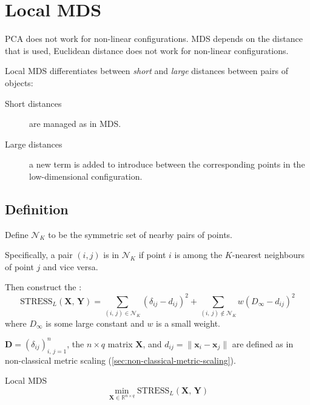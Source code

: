 \pagebreak
\section{Local MDS}

PCA does not work for non-linear configurations. MDS depends on the distance that is
used, Euclidean distance does not work for non-linear configurations.

\begin{note}
	Local MDS differentiates between \emph{short} and \emph{large} distances between
	pairs of objects:
	\begin{description}
		\item[Short distances] are managed as in MDS.
		\item[Large distances] a new term is added to introduce  between the
			corresponding points in the low-dimensional configuration.
	\end{description}
\end{note}

\subsection{Definition}

Define $\mathcal N_K$ to be the symmetric set of nearby pairs of points.

Specifically, a pair $(i, j)$ is in $\mathcal N_K$ if point $i$ is among the $K$-nearest
neighbours of point $j$ and vice versa.

Then construct the :
\begin{equation*}
	\text{STRESS}_L(\boldsymbol X,\, \boldsymbol Y) = \sum_{(i,\, j) \in \mathcal N_K} (\delta_{ij} - d_{ij})^2
	+ \sum_{(i,\, j) \notin \mathcal N_K} w(D_\infty - d_{ij})^2
\end{equation*}
where $D_\infty$ is some large constant and $w$ is a small weight.

$\boldsymbol D = (\delta_{ij})^n_{i,\,j=1}$, the $n \times q$ matrix $\boldsymbol X$, and
$d_{ij} = \lVert \boldsymbol x_i - \boldsymbol x_j \rVert$ are defined as in non-classical
metric scaling (\cref{sec:non-classical-metric-scaling}).

\begin{problem}{Local MDS}{}
\begin{equation*}
	\min_{\boldsymbol X \in \mathds{R}^{n \times q}} \text{STRESS}_L(\boldsymbol X,\, \boldsymbol Y)
\end{equation*}
\end{problem}

